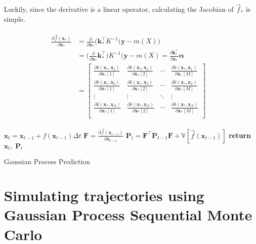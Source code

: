 Luckily, since the derivative is a linear operator, calculating the Jacobian of $\vec{f}_*$ is simple. 

\begin{align}
\begin{split}
    \frac{\partial \vec{f}(\boldsymbol{x}_*)}{\partial \boldsymbol{x}_*} &= \frac{\partial}{\partial \boldsymbol{x}_*} \big(\boldsymbol{k}_*^\intercal K^{-1} (\boldsymbol{y} - m(X)\big)\\
    &= \big(\frac{\partial}{\partial \boldsymbol{x}_*}\boldsymbol{k}_*^\intercal \big) K^{-1} (\boldsymbol{y} - m(X) = \frac{\partial \boldsymbol{k}_*^\intercal}{\partial \boldsymbol{x}_*} \boldsymbol{\alpha}\\
    &= \begin{bmatrix} 
    \frac{\partial k(\boldsymbol{x}_*, \boldsymbol{x}_1)}{\partial \boldsymbol{x}_*[1]} &  \frac{\partial k(\boldsymbol{x}_*, \boldsymbol{x}_1)}{\partial \boldsymbol{x}_*[2]} & \cdots & \frac{\partial k(\boldsymbol{x}_*, \boldsymbol{x}_1)}{\partial \boldsymbol{x}_*[M]} \\
    \frac{\partial k(\boldsymbol{x}_*, \boldsymbol{x}_2)}{\partial \boldsymbol{x}_*[1]} &  \frac{\partial k(\boldsymbol{x}_*, \boldsymbol{x}_2)}{\partial \boldsymbol{x}_*[2]} & \cdots & \frac{\partial k(\boldsymbol{x}_*, \boldsymbol{x}_2)}{\partial \boldsymbol{x}_*[M]} \\
    \vdots & \vdots & \ddots & \vdots\\
    \frac{\partial k(\boldsymbol{x}_*, \boldsymbol{x}_N)}{\partial \boldsymbol{x}_*[1]} &  \frac{\partial k(\boldsymbol{x}_*, \boldsymbol{x}_N)}{\partial \boldsymbol{x}_*[2]} & \cdots & \frac{\partial k(\boldsymbol{x}_*, \boldsymbol{x}_N)}{\partial \boldsymbol{x}_*[M]} \\
    \end{bmatrix}
\end{split}
\end{align}

\begin{algorithm}[h]
\SetAlgoLined
\begin{algoritmic}
    \State $\boldsymbol{x}_{t} = \boldsymbol{x}_{t-1} + f(\boldsymbol{x}_{t-1}) \Delta t$
    \State $\boldsymbol{F} = \frac{\partial \vec{f}(\boldsymbol{x}_{t-1})}{\partial \boldsymbol{x}_{t-1}}$
    \State $\boldsymbol{P}_t = \boldsymbol{F}^\intercal \boldsymbol{P}_{t-1} \boldsymbol{F} +\mathbb{V}[\vec{f}(\boldsymbol{x}_{t-1})]$
    \State \textbf{return} $\boldsymbol{x}_t, \; \boldsymbol{P}_t$
\EndProcedure
\end{algoritmic}
\caption{Gaussian Process Prediction}
\label{alg:gp_prediction}
\end{algorithm}




\section{Simulating trajectories using Gaussian Process Sequential Monte Carlo}